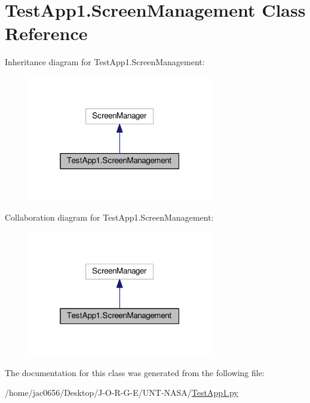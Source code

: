 \hypertarget{classTestApp1_1_1ScreenManagement}{}\section{Test\+App1.\+Screen\+Management Class Reference}
\label{classTestApp1_1_1ScreenManagement}


Inheritance diagram for Test\+App1.\+Screen\+Management\+:\nopagebreak
\begin{figure}[H]
\begin{center}
\leavevmode
\includegraphics[width=229pt]{classTestApp1_1_1ScreenManagement__inherit__graph}
\end{center}
\end{figure}


Collaboration diagram for Test\+App1.\+Screen\+Management\+:\nopagebreak
\begin{figure}[H]
\begin{center}
\leavevmode
\includegraphics[width=229pt]{classTestApp1_1_1ScreenManagement__coll__graph}
\end{center}
\end{figure}


The documentation for this class was generated from the following file\+:\begin{DoxyCompactItemize}
\item 
/home/jac0656/\+Desktop/\+J-\/\+O-\/\+R-\/\+G-\/\+E/\+U\+N\+T-\/\+N\+A\+S\+A/\hyperlink{TestApp1_8py}{Test\+App1.\+py}\end{DoxyCompactItemize}

